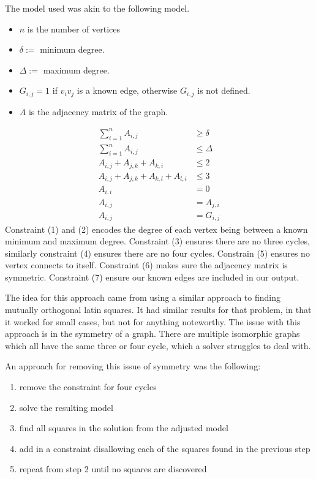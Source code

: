 \documentclass[a4paper]{article}
\begin{document}
The model used was akin to the following model.
\begin{itemize}
	\item $n$ is the number of vertices
	\item $\delta:=$ minimum degree.
	\item $\Delta:=$ maximum degree.
	\item $G_{i,j} = 1$ if $v_iv_j$ is a known edge, otherwise $G_{i,j}$ is not defined.
	\item $A$ is the adjacency matrix of the graph.
\end{itemize}
\begin{align}
\sum_{i=1}^{n}A_{i,j}&\geq\delta \\
\sum_{i=1}^{n}A_{i,j}&\leq\Delta \\
A_{i,j}+A_{j,k}+A_{k,i} &\leq 2 \\
A_{i,j}+A_{j,k}+A_{k,l}+A_{l,i} &\leq 3 \\
A_{i,i}&=0 \\
A_{i,j}&=A_{j,i} \\
A_{i,j}&=G_{i,j}
\end{align}
Constraint (1) and (2) encodes the degree of each vertex being between a known minimum and maximum degree. Constraint (3) ensures there are no three cycles, similarly constraint (4) ensures there are no four cycles. Constrain (5) ensures no vertex connects to itself. Constraint (6) makes sure the adjacency matrix is symmetric. Constraint (7) ensure our known edges are included in our output.

The idea for this approach came from using a similar approach to finding mutually orthogonal latin squares. It had similar results for that problem, in that it worked for small cases, but not for anything noteworthy. The issue with this approach is in the symmetry of a graph. There are multiple isomorphic graphs which all have the same three or four cycle, which a solver struggles to deal with.

An approach for removing this issue of symmetry was the following:
\begin{enumerate}
\item remove the constraint for four cycles
\item solve the resulting model
\item find all squares in the solution from the adjusted model
\item add in a constraint disallowing each of the squares found in the previous step
\item repeat from step 2 until no squares are discovered
\end{enumerate}
\end{document}
